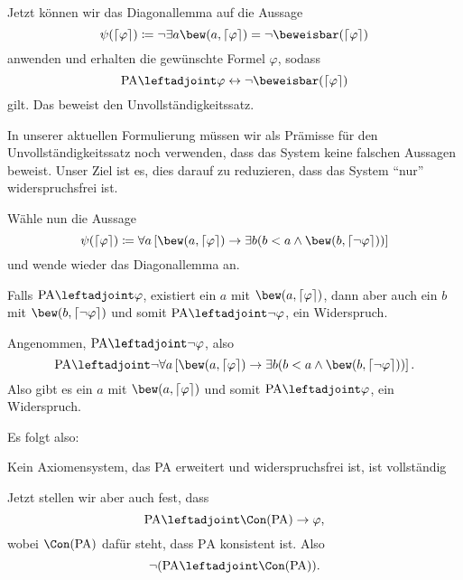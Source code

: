 \documentclass[ngerman]{scrartcl}
\def\shows{\leftadjoint}
\begin{document}
Jetzt können wir das Diagonallemma auf die Aussage
\[
  \psi (\left\lceil \varphi  \right\rceil) \coloneqq \lnot \exists a \bew(a, \left\lceil \varphi  \right\rceil ) = \lnot \beweisbar(\left\lceil \varphi  \right\rceil )
\]
anwenden und erhalten die gewünschte Formel $\varphi $, sodass
\[
  \text{PA} \shows \varphi \leftrightarrow \lnot \beweisbar(\left\lceil \varphi  \right\rceil )
\]
gilt.
Das beweist den Unvollständigkeitssatz.

\begin{remark}
  In unserer aktuellen Formulierung müssen wir als Prämisse für den Unvollständigkeitssatz
  noch verwenden, dass das System keine falschen Aussagen beweist.
  Unser Ziel ist es, dies darauf zu reduzieren, dass das System \enquote{nur}
  widerspruchsfrei ist.

  Wähle nun die Aussage
  \[
    \psi (\left\lceil \varphi  \right\rceil ) \coloneqq 
    \forall a \left[\bew(a, \left\lceil \varphi  \right\rceil ) \to 
    \exists b (b < a \land \bew(b, \left\lceil \lnot \varphi  \right\rceil ))\right]
  \]
  und wende wieder das Diagonallemma an.

  Falls $\text{PA} \shows \varphi $, existiert ein $a$ mit $\bew(a, \left\lceil \varphi  \right\rceil )$, dann aber auch ein $b$ mit $\bew(b, \left\lceil \lnot \varphi  \right\rceil )$ und somit $\text{PA} \shows \lnot \varphi $, ein Widerspruch.

  Angenommen, $\text{PA} \shows \lnot \varphi $,
  also
  \[
    \text{PA} \shows \lnot \forall a \left[ \bew(a, \left\lceil \varphi  \right\rceil ) \to \exists b (b <a \land \bew(b, \left\lceil \lnot \varphi  \right\rceil ))\right]
    .
  \]
  Also gibt es ein $a$ mit $\bew(a, \left\lceil \varphi  \right\rceil )$ und somit
  $\text{PA} \shows \varphi $, ein Widerspruch.

  Es folgt also:

  {\color{green!70!black} Kein Axiomensystem, das PA erweitert und widerspruchsfrei ist, ist vollständig }

  Jetzt stellen wir aber auch fest, dass
  \[
    \text{PA} \shows \Con(\text{PA}) \to \varphi 
    ,
  \]
  wobei $\Con(\text{PA})$ dafür steht, dass $\text{PA}$ konsistent ist.
  Also
  \[
    \lnot (    \text{PA} \shows \Con(\text{PA}))
    .
  \]
\end{remark}

\end{document}
